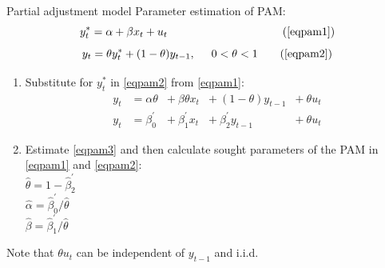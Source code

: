 \documentclass{beamer}
\begin{document}
\begin{frame}{Partial adjustment model}
Parameter estimation of PAM:
\begin{equation*}
{y}_t^\ast = \alpha + \beta x_t + u_t ~~~~~~~~~~~~~~~~~~~~~~~~~ \tag{\ref{eqpam1}}
\end{equation*}
\vspace{-0.6cm}
\begin{equation*}
y_t= \theta {y}_t^\ast + (1-\theta)y_{t-1}, \hspace{0.5cm} 0 < \theta < 1 \tag{\ref{eqpam2}}
\end{equation*}

\begin{enumerate}
\item Substitute for $y_t^\ast$ in \eqref{eqpam2} from \eqref{eqpam1}:\\
\begin{equation}
\begin{aligned}
y_t &= \alpha \theta &+~ \beta \theta x_t &+~ (1-\theta) y_{t-1} &+~ \theta u_t \label{eqpam3}\\
y_t &= \beta_0^{\prime} &+~ \beta_1^{\prime} x_t &+~ \beta_2^{\prime} y_{t-1} &+~ \theta u_t
\end{aligned}
\end{equation}
\item Estimate \eqref{eqpam3} and then calculate sought parameters of the PAM in \eqref{eqpam1} and \eqref{eqpam2}:\\
\smallskip
$\hat{\theta}= 1-\hat{\beta}_2^{\prime}$\\
\smallskip
$\hat{\alpha} =\hat{\beta}_0^{\prime}/\hat{\theta}$\\
\smallskip
$\hat{\beta} =\hat{\beta}_1^{\prime}/\hat{\theta}$
\end{enumerate}
\medskip
\small{\qquad Note that $\theta u_t$ can be independent of $y_{t-1}$ and i.i.d.}
\end{frame}
\end{document}
